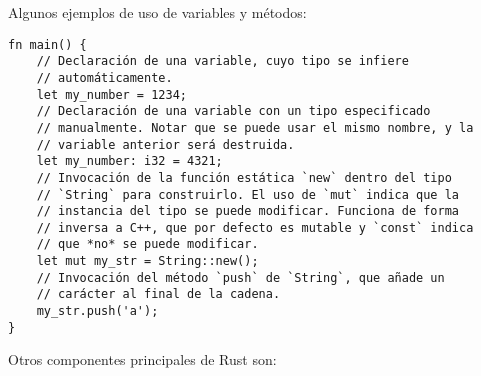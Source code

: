 Algunos ejemplos de uso de variables y métodos:

\begin{verbatim}
fn main() {
    // Declaración de una variable, cuyo tipo se infiere
    // automáticamente.
    let my_number = 1234;
    // Declaración de una variable con un tipo especificado
    // manualmente. Notar que se puede usar el mismo nombre, y la
    // variable anterior será destruida.
    let my_number: i32 = 4321;
    // Invocación de la función estática `new` dentro del tipo
    // `String` para construirlo. El uso de `mut` indica que la
    // instancia del tipo se puede modificar. Funciona de forma
    // inversa a C++, que por defecto es mutable y `const` indica
    // que *no* se puede modificar.
    let mut my_str = String::new();
    // Invocación del método `push` de `String`, que añade un
    // carácter al final de la cadena.
    my_str.push('a');
}
\end{verbatim}

Otros componentes principales de Rust son:

